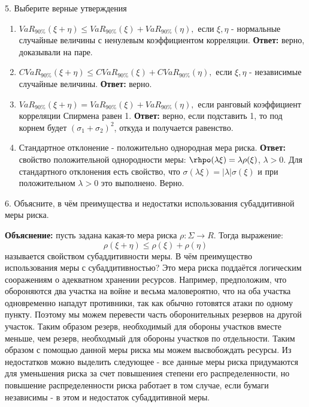 \documentclass[%
12pt, %
final, %
oneside, %
onecolumn, %
centertags]{article} %
\theoremstyle{plain}
\theoremstyle{definition}
\theoremstyle{remark}
\begin{document}
\newpage

5. Выберите верные утверждения

\begin{enumerate}[label=\alph*.]
\setlength\itemsep{-0.15em}
    \item $VaR_{90\%}(\xi+\eta)\leqslant VaR_{90\%}(\xi)+VaR_{90\%}(\eta),$ если $\xi,\eta$ - нормальные случайные величины с ненулевым коэффициентом корреляции.  \textbf{Ответ:} верно, доказывали на паре.
    \item $CVaR_{90\%}(\xi+\eta)\leqslant CVaR_{90\%}(\xi)+CVaR_{90\%}(\eta),$ если $\xi,\eta$ - независимые случайные величины. \textbf{Ответ:} верно.
    \item $VaR_{90\%}(\xi+\eta)= VaR_{90\%}(\xi)+VaR_{90\%}(\eta),$ если ранговый коэффициент корреляции Спирмена равен 1. \textbf{Ответ:} верно, если подставить 1, то под корнем будет $(\sigma_1+\sigma_2)^2$, откуда и получается равенство.
    \item Стандартное отклонение - положительно однородная мера риска. \textbf{Ответ:} свойство положительной однородности меры: $\rhpo(\lambda \xi) = \lambda \rho(\xi)$, $\lambda >0$. Для стандартного отклонения есть свойство, что $\sigma(\lambda \xi) = \vert \lambda \vert \sigma(\xi)$ и при положительном $\lambda > 0$ это выполнено. Верно. 

\end{enumerate}

\newpage

6. Объясните, в чём преимущества и недостатки использования субаддитивной меры
риска.

\textbf{Объяснение:} пусть задана какая-то мера риска $\rho: \Sigma \to R$. Тогда выражение:
$$\rho(\xi + \eta) \leqslant \rho(\xi) + \rho(\eta)$$
называется свойством субаддитивности меры. В чём преимущество использования меры с субаддитивностью? Это мера риска поддаётся логическим сооражениям о адекватном хранении ресурсов. Например, предположим, что обороняются два участка на войне и весьма маловероятно, что на оба участка одновременно нападут противники, так как обычно готовятся атаки по одному пункту. Поэтому мы можем перевести часть оборонительных резервов на другой участок. Таким образом резерв, необходимый для обороны участков вместе меньше, чем резерв, необходмый для обороны участков по отдельности. Таким образом с помощью данной меры риска мы можем высвобождать ресурсы. Из недостатков можно выделить следующее - все данные меры риска придумаются для уменьшения риска за счет повышениея степени его распределенности, но повышение распределенности риска работает в том случае, если бумаги независимы - в этом и недостаток субаддитивной меры.
\end{document}
